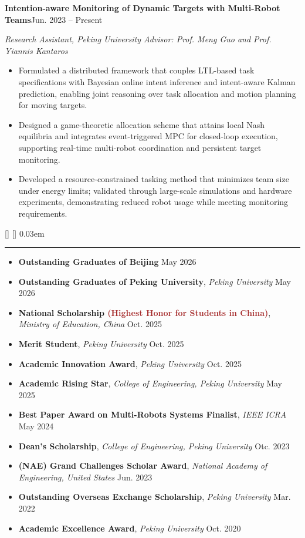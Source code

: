 \documentclass{article}
\newcommand{\SectionFirstScale}{1.25}
\newcommand{\SectionFirstLift}{0.0ex}
\newcommand{\SectionGap}{4pt}
\newcommand{\SectionRule}{0.6pt}
\newcommand{\SectionSize}{11.9552pt}
\newcommand{\SectionLeading}{14.3462pt}
\newcommand{\SectionFont}{\fontsize{\SectionSize}{\SectionLeading}\selectfont}
\newcommand{\entry}[2]{\textbf{#1}\hfill{#2}\par}
\newcommand{\sectionheader}[1]{\vspace{6pt}{\SectionFont\textbf{#1}}\par\vspace{2pt}\hrule\vspace{4pt}}
\renewcommand{\sectionheader}[1]{%
  \vspace{8pt}%
  \StrChar{#1}{1}[\HeaderFirst]%
  \StrGobbleLeft{#1}{1}[\HeaderRest]%
  {\SectionFont\textcolor{HeaderBlue}{%
    \raisebox{\SectionFirstLift}{\scalebox{\SectionFirstScale}{\HeaderFirst}}%
    \kern0.03em
    \HeaderRest
  }}%
  \par\nointerlineskip
  \vspace{\SectionGap}%
  {\color{HeaderBlue}\rule{\linewidth}{\SectionRule}}%
  \vspace{2pt}%
}
\begin{document}
\medskip
\entry{Intention-aware Monitoring of Dynamic Targets with Multi-Robot Teams}{Jun. 2023 -- Present}
\vspace{2pt}
\textit{Research Assistant, Peking University \hfill Advisor: Prof. Meng Guo and Prof. Yiannis Kantaros}
\begin{itemize}[leftmargin=12pt, topsep=2pt, itemsep=0pt]
  \item Formulated a distributed framework that couples LTL-based task specifications with Bayesian online intent inference and intent-aware Kalman prediction, enabling joint reasoning over task allocation and motion planning for moving targets.
  \item Designed a game-theoretic allocation scheme that attains local Nash equilibria and integrates event-triggered MPC for closed-loop execution, supporting real-time multi-robot coordination and persistent target monitoring.
  \item Developed a resource-constrained tasking method that minimizes team size under energy limits; validated through large-scale simulations and hardware experiments, demonstrating reduced robot usage while meeting monitoring requirements.
\end{itemize}

\sectionheader{AWARDS \& HONORS}
\begin{itemize}[leftmargin=0pt, topsep=2pt, itemsep=0pt]
  \item[] \textbf{Outstanding Graduates of Beijing} \hfill May 2026
  \item[] \textbf{Outstanding Graduates of Peking University}, \textit{Peking University} \hfill May 2026
  \item[] \textbf{National Scholarship \textcolor{Brown}{(Highest Honor for Students in China)}}, \textit{Ministry of Education, China} \hfill Oct. 2025
  \item[] \textbf{Merit Student}, \textit{Peking University} \hfill Oct. 2025
  \item[] \textbf{Academic Innovation Award}, \textit{Peking University} \hfill Oct. 2025
  \item[] \textbf{Academic Rising Star}, \textit{College of Engineering, Peking University} \hfill May 2025
  \item[] \textbf{Best Paper Award on Multi-Robots Systems Finalist}, \textit{IEEE ICRA} \hfill May 2024
  \item[] \textbf{Dean’s Scholarship}, \textit{College of Engineering, Peking University} \hfill Otc. 2023
  \item[] \textbf{(NAE) Grand Challenges Scholar Award}, \textit{National Academy of Engineering, United States} \hfill Jun. 2023
  \item[] \textbf{Outstanding Overseas Exchange Scholarship}, \textit{Peking University} \hfill Mar. 2022
  \item[] \textbf{Academic Excellence Award}, \textit{Peking University} \hfill Oct. 2020
\end{itemize}
\end{document}
